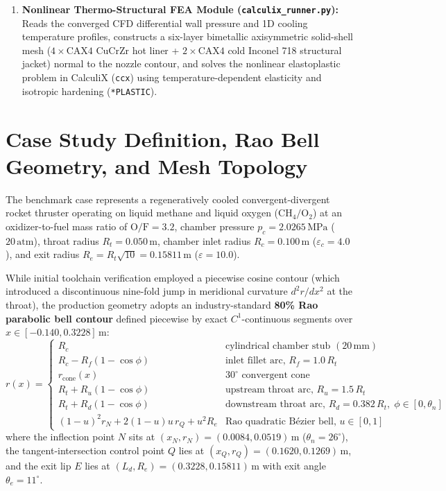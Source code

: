 \documentclass[11pt,a4paper]{article}
\begin{document}
\begin{enumerate}
    \item \textbf{Nonlinear Thermo-Structural FEA Module (\texttt{calculix\_runner.py}):} Reads the converged CFD differential wall pressure and 1D cooling temperature profiles, constructs a six-layer bimetallic axisymmetric solid-shell mesh ($4\times\mathrm{CAX4}$ $\mathrm{CuCrZr}$ hot liner + $2\times\mathrm{CAX4}$ cold Inconel 718 structural jacket) normal to the nozzle contour, and solves the nonlinear elastoplastic problem in CalculiX (\texttt{ccx}) using temperature-dependent elasticity and isotropic hardening (\texttt{*PLASTIC}).
\end{enumerate}

\section{Case Study Definition, Rao Bell Geometry, and Mesh Topology}

The benchmark case represents a regeneratively cooled convergent-divergent rocket thruster operating on liquid methane and liquid oxygen ($\mathrm{CH_4/O_2}$) at an oxidizer-to-fuel mass ratio of $\mathrm{O/F} = 3.2$, chamber pressure $p_c = 2.0265\,\mathrm{MPa}$ ($20\,\mathrm{atm}$), throat radius $R_t = 0.050\,\mathrm{m}$, chamber inlet radius $R_c = 0.100\,\mathrm{m}$ ($\varepsilon_c = 4.0$), and exit radius $R_e = R_t\sqrt{10} = 0.15811\,\mathrm{m}$ ($\varepsilon = 10.0$).

While initial toolchain verification employed a piecewise cosine contour (which introduced a discontinuous nine-fold jump in meridional curvature $d^2r/dx^2$ at the throat), the production geometry adopts an industry-standard \textbf{80\% Rao parabolic bell contour} defined piecewise by exact $C^1$-continuous segments over $x \in [-0.140, 0.3228]\,\mathrm{m}$:
\begin{equation}
r(x) = \begin{cases}
R_c & \text{cylindrical chamber stub } (20\,\mathrm{mm}) \\
R_c - R_f\left(1 - \cos\phi\right) & \text{inlet fillet arc, } R_f = 1.0\,R_t \\
r_{\mathrm{cone}}(x) & 30^\circ\text{ convergent cone} \\
R_t + R_u\left(1 - \cos\phi\right) & \text{upstream throat arc, } R_u = 1.5\,R_t \\
R_t + R_d\left(1 - \cos\phi\right) & \text{downstream throat arc, } R_d = 0.382\,R_t,\; \phi \in [0, \theta_n] \\
(1-u)^2 r_N + 2(1-u)u\,r_Q + u^2 R_e & \text{Rao quadratic B\'ezier bell, } u \in [0, 1]
\end{cases}
\end{equation}
where the inflection point $N$ sits at $(x_N, r_N) = (0.0084, 0.0519)\,\mathrm{m}$ ($\theta_n = 26^\circ$), the tangent-intersection control point $Q$ lies at $(x_Q, r_Q) = (0.1620, 0.1269)\,\mathrm{m}$, and the exit lip $E$ lies at $(L_d, R_e) = (0.3228, 0.15811)\,\mathrm{m}$ with exit angle $\theta_e = 11^\circ$.
\end{document}
